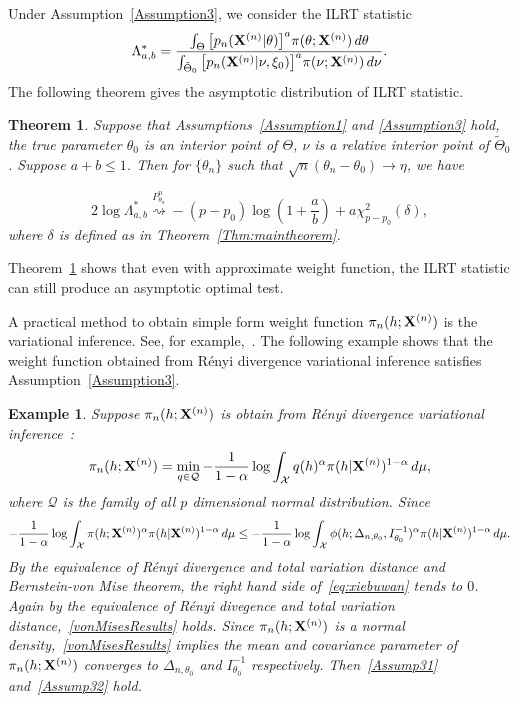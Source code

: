 \documentclass[11pt]{article}
\theoremstyle{plain}
\newtheorem{theorem}{\quad\quad Theorem}
\newtheorem{example}{Example}
\theoremstyle{definition}
\theoremstyle{remark}
\begin{document}
Under Assumption~\ref{Assumption3}, we consider the ILRT statistic
\begin{equation}
    \Lambda^*_{a,b}=\frac{\int_{\Theta} \big[p_n(\mathbf{X}^{(n)}|\theta)\big]^{a}\pi(\theta;\mathbf{X}^{(n)})\,d\theta}{\int_{\tilde{\Theta}_0} \big[p_n(\mathbf{X}^{(n)}|\nu,\xi_0)\big]^{a}\pi(\nu;\mathbf{X}^{(n)})\,d\nu}.
\label{eq:definition}
\end{equation}
The following theorem gives the asymptotic distribution of ILRT statistic.


\begin{theorem}\label{theoremMain}
    Suppose that Assumptions~\ref{Assumption1} and \ref{Assumption3} hold, the true parameter $\theta_0$ is an interior point of $\Theta$, $\nu$ is a relative interior point of $\tilde{\Theta}_0$.
    Suppose $a+b\leq 1$.
    Then for $\{\theta_n\}$ such that $\sqrt{n}(\theta_n-\theta_0)\to \eta$, we have

        $$
        2\log \Lambda^*_{a,b}\overset{P^n_{\theta_n}}{\rightsquigarrow}-{(p-p_0)}\log (1+\frac{a}{b})+{a}\chi^2_{p-p_0}(\delta),
        $$
        where $\delta$ is defined as in Theorem~\ref{Thm:maintheorem}.
\end{theorem}
Theorem~\ref{theoremMain} shows that even with approximate weight function, the ILRT statistic can still produce an asymptotic optimal test.

A practical method to obtain simple form weight function $\pi_n(h;\mathbf{X}^{(n)})$ is the variational inference. See, for example,~\cite{blei2017}.
The following example shows that the weight function obtained from R\'{e}nyi divergence variational inference satisfies Assumption~\ref{Assumption3}.

\begin{example}
    Suppose $\pi_n(h;\mathbf{X}^{(n)})$ is obtain from R\'{e}nyi divergence variational inference~\citep{NIPS2016_6208}:
    $$
        \pi_n(h;\mathbf{X}^{(n)})=\min_{q\in\mathcal{Q}} -\frac{1}{1-\alpha} \log \int_{\mathcal X} q(h)^{\alpha} \pi(h|\mathbf{X}^{(n)})^{1-\alpha}\, d\mu,
    $$
    where $\mathcal{Q}$ is the family of all $p$ dimensional normal distribution.
    Since
    \begin{equation}\label{eq:xiebuwan}
    -\frac{1}{1-\alpha} \log \int_{\mathcal X} \pi(h;\mathbf{X}^{(n)})^{\alpha} \pi(h|\mathbf{X}^{(n)})^{1-\alpha}\, d\mu
    \leq
    -\frac{1}{1-\alpha} \log \int_{\mathcal X} \phi(h;\Delta_{n,\theta_0}, I_{\theta_0}^{-1})^{\alpha} \pi(h|\mathbf{X}^{(n)})^{1-\alpha}\, d\mu.
    \end{equation}
    By the equivalence of R\'{e}nyi divergence and total variation distance and Bernstein-von Mise theorem, the right hand side of~\eqref{eq:xiebuwan} tends to $0$.
    Again by the equivalence of R\'{e}nyi divegence and total variation distance,~\eqref{vonMisesResults} holds.
    Since $\pi_n(h;\mathbf{X}^{(n)})$ is a normal density,~\eqref{vonMisesResults} implies the mean and covariance parameter of $\pi_n(h;\mathbf{X}^{(n)})$ converges to $\Delta_{n,\theta_0}$ and $I_{\theta_0}^{-1}$ respectively. Then~\eqref{Assump31} and~\eqref{Assump32} hold.
\end{example}
\end{document}

